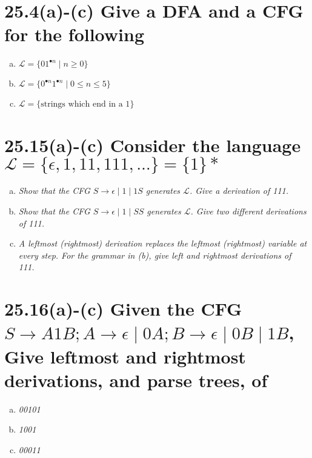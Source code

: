 \documentclass{article}
\begin{document}
\section*{25.4(a)-(c)  \normalsize Give a DFA and a CFG for the following}

\begin{enumerate}[(a)]
  \item \textit{$\mathscr{L} = \{01^{\bullet n} \mid n \geq 0\}$}
  \item \textit{$\mathscr{L} = \{0^{\bullet n}1^{\bullet n} \mid 0 \leq n \leq 5\}$}
  \item \textit{$\mathscr{L} = \{\text{strings which end in a 1}\}$}
\end{enumerate}





\section*{25.15(a)-(c)  \normalsize Consider the language $\mathscr{L} = \{\epsilon,1,11,111,\dots\}=\{1\}*$}

\begin{enumerate}[(a)]
  \item \textit{Show that the CFG $S \rightarrow \epsilon \mid 1 \mid 1S$ generates $\mathscr{L}$. Give a derivation of 111.}
  \item \textit{Show that the CFG $S \rightarrow \epsilon \mid 1 \mid SS$ generates $\mathscr{L}$. Give two different derivations of 111.}
  \item \textit{A leftmost (rightmost) derivation replaces the leftmost (rightmost) variable at every step. For the grammar in (b), give left and rightmost derivations of 111.}
\end{enumerate}





\section*{25.16(a)-(c)  \normalsize Given the CFG $S \rightarrow A1B; A \rightarrow \epsilon \mid 0A; B \rightarrow \epsilon \mid 0B \mid 1B$, Give leftmost and rightmost derivations, and parse trees, of}

\begin{enumerate}[(a)]
  \item \textit{00101}
  \item \textit{1001}
  \item \textit{00011}
\end{enumerate}
\end{document}
